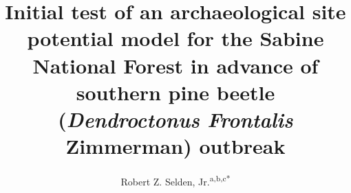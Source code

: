 \documentclass[review]{elsarticle}
\begin{document}
\begin{frontmatter}


\title{Initial test of an archaeological site potential model for the Sabine National Forest in advance of southern pine beetle (\textit{Dendroctonus Frontalis} Zimmerman) outbreak}



\author{Robert Z. Selden, Jr.\textsuperscript{a,b,c*}}
\address[1]{Heritage Research Center, Stephen F. Austin State University, United States}
\address[2]{Cultural Heritage Department, Jean Monnet University, France}
\address[3]{ORCID ID \href{http://orcid.org/0000-0002-1789-8449}{0000-0002-1789-8449}}


\end{frontmatter}
\end{document}
